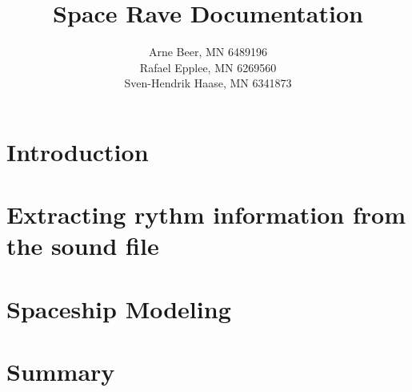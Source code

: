 \documentclass{article}
\title{Space Rave Documentation}
\author{Arne Beer, MN 6489196\\
Rafael Epplee, MN 6269560\\
Sven-Hendrik Haase, MN 6341873}
\begin{document}
\maketitle
    \section{Introduction}

    \section{Extracting rythm information from the sound file}

    \section{Spaceship Modeling}

    \section{Summary}
\end{document}
